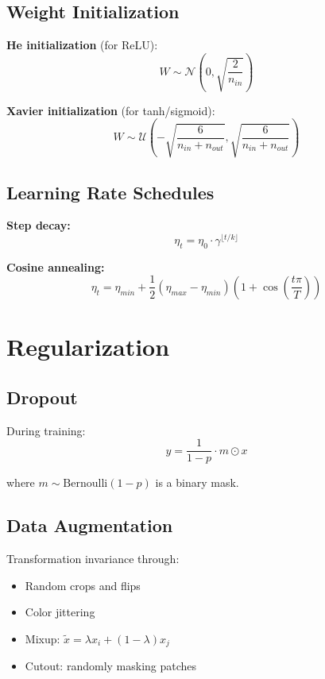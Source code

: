 \documentclass[12pt,a4paper]{article}
\begin{document}
\subsection{Weight Initialization}

\textbf{He initialization} (for ReLU):
\begin{equation}
W \sim \mathcal{N}\left(0, \sqrt{\frac{2}{n_{in}}}\right)
\end{equation}

\textbf{Xavier initialization} (for tanh/sigmoid):
\begin{equation}
W \sim \mathcal{U}\left(-\sqrt{\frac{6}{n_{in} + n_{out}}}, \sqrt{\frac{6}{n_{in} + n_{out}}}\right)
\end{equation}

\subsection{Learning Rate Schedules}

\textbf{Step decay:}
\begin{equation}
\eta_t = \eta_0 \cdot \gamma^{\lfloor t/k \rfloor}
\end{equation}

\textbf{Cosine annealing:}
\begin{equation}
\eta_t = \eta_{min} + \frac{1}{2}(\eta_{max} - \eta_{min})\left(1 + \cos\left(\frac{t\pi}{T}\right)\right)
\end{equation}

\section{Regularization}

\subsection{Dropout}

During training:
\begin{equation}
y = \frac{1}{1-p} \cdot m \odot x
\end{equation}

where $m \sim \text{Bernoulli}(1-p)$ is a binary mask.

\subsection{Data Augmentation}

Transformation invariance through:
\begin{itemize}
    \item Random crops and flips
    \item Color jittering
    \item Mixup: $\tilde{x} = \lambda x_i + (1-\lambda)x_j$
    \item Cutout: randomly masking patches
\end{itemize}
\end{document}
